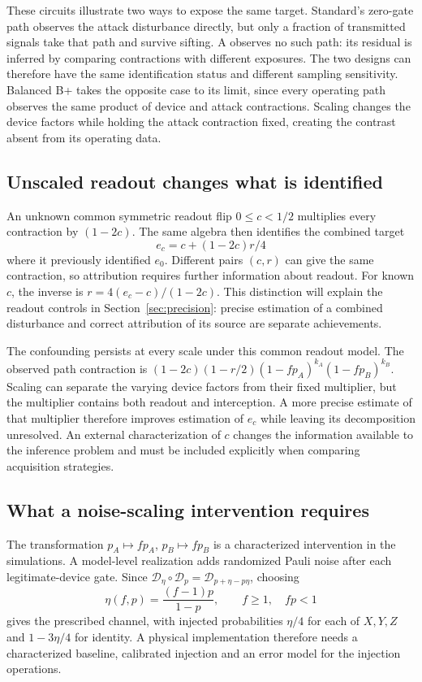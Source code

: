 \documentclass[manuscript,screen,review,anonymous]{acmart}
\begin{document}
These circuits illustrate two ways to expose the same target. Standard's
zero-gate path observes the attack disturbance directly, but only a fraction
of transmitted signals take that path and survive sifting. A observes no
such path: its residual is inferred by comparing contractions with different
exposures. The two designs can therefore have the same identification status
and different sampling sensitivity. Balanced B+ takes the opposite case to
its limit, since every operating path observes the same product of device
and attack contractions. Scaling changes the device factors while holding the
attack contraction fixed, creating the contrast absent from its operating data.

\subsection{Unscaled readout changes what is identified}
An unknown common symmetric readout flip $0\leq c<1/2$ multiplies every
contraction by $(1-2c)$. The same algebra then identifies the combined target
\begin{equation}
 e_c=c+(1-2c)r/4
 \label{eq:residual}
\end{equation}
where it previously identified $e_0$. Different pairs $(c,r)$ can give the
same contraction, so attribution requires further information about readout.
For known $c$, the inverse is $r=4(e_c-c)/(1-2c)$.
This distinction will explain the readout controls in
Section~\ref{sec:precision}: precise estimation of a combined disturbance
and correct attribution of its source are separate achievements.

The confounding persists at every scale under this common readout model.
The observed path contraction is
$(1-2c)(1-r/2)(1-fp_A)^{k_A}(1-fp_B)^{k_B}$.
Scaling can separate the varying device factors from their fixed multiplier,
but the multiplier contains both readout and interception. A more precise
estimate of that multiplier therefore improves estimation of $e_c$ while
leaving its decomposition unresolved. An external characterization of $c$
changes the information available to the inference problem and must be
included explicitly when comparing acquisition strategies.

\subsection{What a noise-scaling intervention requires}
The transformation $p_A\mapsto fp_A$, $p_B\mapsto fp_B$ is a characterized
intervention in the simulations. A model-level realization adds randomized
Pauli noise after each legitimate-device gate. Since
$\mathcal D_\eta\circ\mathcal D_p=\mathcal D_{p+\eta-p\eta}$, choosing
\begin{equation}
 \eta(f,p)=\frac{(f-1)p}{1-p},\qquad f\geq1,\quad fp<1
 \label{eq:injection}
\end{equation}
gives the prescribed channel, with injected probabilities $\eta/4$ for each
of $X,Y,Z$ and $1-3\eta/4$ for identity. A physical implementation therefore
needs a characterized baseline, calibrated injection and an error model for
the injection operations.
\end{document}
